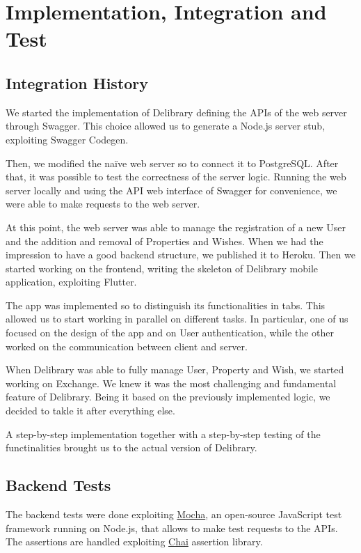 \chapter{Implementation, Integration and Test}

\section{Integration History}
We started the implementation of Delibrary defining the APIs of the web server through Swagger.
This choice allowed us to generate a Node.js server stub, exploiting Swagger Codegen.

Then, we modified the naïve web server so to connect it to PostgreSQL.
After that, it was possible to test the correctness of the server logic.
Running the web server locally and using the API web interface of Swagger for convenience, we were able to make requests to the web server.

At this point, the web server was able to manage the registration of a new User and the addition and removal of Properties and Wishes.
When we had the impression to have a good backend structure, we published it to Heroku.
Then we started working on the frontend, writing the skeleton of Delibrary mobile application, exploiting Flutter.

The app was implemented so to distinguish its functionalities in tabs. This allowed us to start working in parallel on different tasks.
In particular, one of us focused on the design of the app and on User authentication, while the other worked on the communication between client and server.

When Delibrary was able to fully manage User, Property and Wish, we started working on Exchange.
We knew it was the most challenging and fundamental feature of Delibrary.
Being it based on the previously implemented logic, we decided to takle it after everything else.

A step-by-step implementation together with a step-by-step testing of the functinalities brought us to the actual version of Delibrary.

\section{Backend Tests}
The backend tests were done exploiting \href{https://mochajs.org}{Mocha}, an open-source JavaScript test framework running on Node.js, that allows to make test requests to the APIs.
The assertions are handled exploiting \href{https://www.chaijs.com/}{Chai} assertion library.

